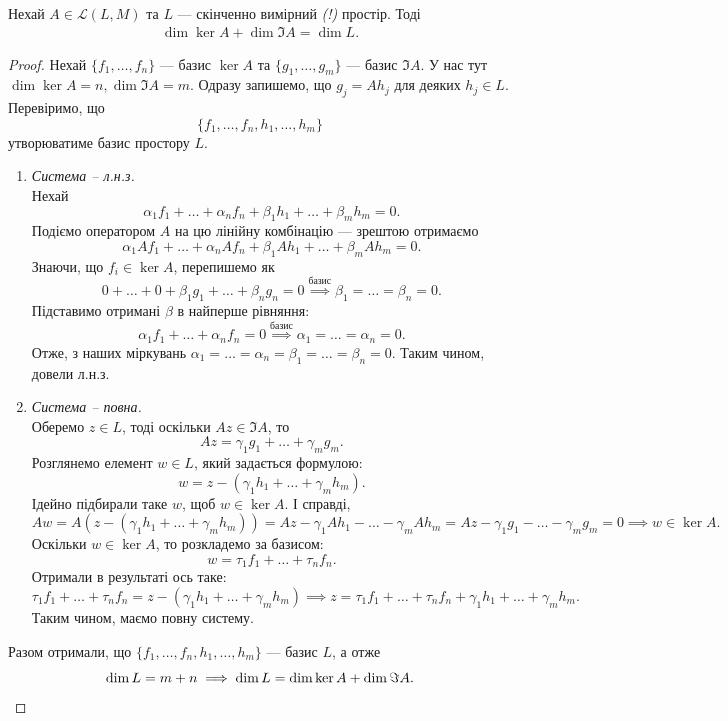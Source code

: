 \documentclass{math_library}
\begin{document}
	\begin{theorem}
	Нехай $A \in \mathcal{L}(L,M)$ та $L$ --- скінченно вимірний \textit{(!)} простір. Тоді
	\begin{align*}
	\dim \ker A + \dim \Im A = \dim L.
	\end{align*}
	\end{theorem}
	
	\begin{proof}
	Нехай $\{f_1, \dots, f_n\}$ --- базис $\ker A$ та $\{g_1, \dots, g_m\}$ --- базис $\Im A$. У нас тут $\dim \ker A = n, \dim \Im A = m$. Одразу запишемо, що $g_j = Ah_j$ для деяких $h_j \in L$. Перевіримо, що 
	\[
	\{f_1,\dots, f_n, h_1,\dots, h_m\}
	\]
	утворюватиме базис простору $L$.
	
	\begin{enumerate}[wide=0pt,label={\Roman*.}]
	\item \textit{Система -- л.н.з.}\\
	Нехай
	\[
	\alpha_1 f_1 + \dots + \alpha_n f_n + \beta_1 h_1 + \dots + \beta_m h_m = 0.
	\]
	Подіємо оператором $A$ на цю лінійну комбінацію --- зрештою отримаємо
	\[
	\alpha_1 Af_1 + \dots + \alpha_n Af_n + \beta_1 Ah_1 + \dots + \beta_m A h_m = 0.
	\]
	Знаючи, що $f_i \in \ker A$, перепишемо як
	\[
	0 + \dots + 0 + \beta_1 g_1 + \dots + \beta_n g_n = 0 \overset{\textrm{базис}}{\implies} \beta_1 = \dots = \beta_n = 0.
	\]
	Підставимо отримані $\beta$ в найперше рівняння:
	\[
	\alpha_1 f_1 + \dots + \alpha_n f_n = 0 \overset{\textrm{базис}}{\implies} \alpha_1 = \dots = \alpha_n = 0.
	\]
	Отже, з наших міркувань $\alpha_1 = \dots = \alpha_n = \beta_1 = \dots = \beta_n = 0$. Таким чином, довели л.н.з.
	
	\item \textit{Система -- повна.}\\
	Оберемо $z \in L$, тоді оскільки $Az \in \Im A$, то
	\[
	Az = \gamma_1 g_1 + \dots + \gamma_m g_m.
	\]
	Розглянемо елемент $w \in L$, який задається формулою: 
	\[
	w = z - (\gamma_1 h_1 + \dots + \gamma_m h_m).
	\]
	Ідейно підбирали таке $w$, щоб $w \in \ker A$. І справді,
	\[
	Aw = A(z - (\gamma_1 h_1 + \dots + \gamma_m h_m)) = Az - \gamma_1 Ah_1 - \dots - \gamma_m Ah_m = Az - \gamma_1 g_1 - \dots - \gamma_m g_m = 0 \implies w \in \ker A.
	\]
	Оскільки $w \in \ker A$, то розкладемо за базисом:
	\[
	w = \tau_1 f_1 + \dots + \tau_n f_n.
	\] 
	Отримали в результаті ось таке:
	\[
	\tau_1 f_1 + \dots + \tau_n f_n = z - (\gamma_1 h_1 + \dots + \gamma_m h_m) \implies z = \tau_1 f_1 + \dots + \tau_n f_n + \gamma_1 h_1 + \dots + \gamma_m h_m.
	\]
	Таким чином, маємо повну систему.
	\end{enumerate}
	
	Разом отримали, що $\{f_1,\dots, f_n, h_1,\dots, h_m\}$ --- базис $L$, а отже
	\[
	\dim L = m+n  \implies \dim L = \dim \ker A + \dim \Im A. \qedhere
	\]
	\end{proof}
\end{document}
